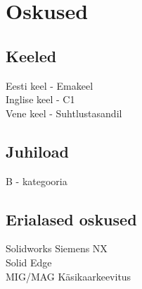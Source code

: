 \documentclass[letterpaper]{deedy-resume} %
\begin{document}
\begin{minipage}[t]{0.33\textwidth}
\section{Oskused}

\subsection{Keeled}

Eesti keel - Emakeel \\
Inglise keel - C1 \\
Vene keel - Suhtlustasandil \\

\sectionspace %


\subsection{Juhiload}

B - kategooria \\

\sectionspace %

\subsection{Erialased oskused}

\sectionspace

Solidworks \textbullet{} Siemens NX \textbullet{}\\
Solid Edge\\
MIG/MAG \textbullet{} Käsikaarkeevitus \\

\sectionspace


\sectionspace



\sectionspace %


\end{minipage} %
\hfill
%
\end{document}
